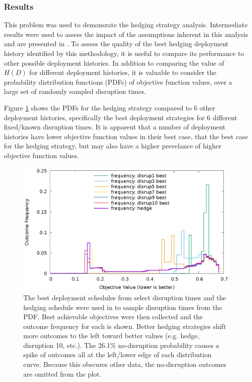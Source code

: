 \subsubsection{Results}

This problem was used to demonsrate the hedging strategy analysis.
Intermediate results were used to assess the impact of the assumptions
inherent in this analysis and are presented in .  To
assess the quality of the best hedging deployment history identified by this
methodology, it is useful to compare its performance to other possible
deployment histories.  In addition to comparing the value of $H(D)$ for
different deployment histories, it is valuable to consider the probability
distribution functions (PDFs) of objective function values, over a large set
of randomly sampled disruption times.


Figure \ref{fig:exp3-outcome-dists} shows the PDFs for the hedging strategy
compared to 6 other deployment histories, specifically the best deployment
strategies for 6 different fixed/known disruption times.  It is apparent that
a number of deployment histories have lower objective function values in their
best case, that the best case for the hedging strategy, but may also have a
higher prevelance of higher objective function values.

\begin{figure}[!htb]
    \centering
    \includegraphics[width=1.0\columnwidth]{dists.eps}
    \caption[Experiment 3: Outcome Distributions]{
        The best deployment schedules from select disruption times and the
        hedging schedule were used in to sample disruption times from the PDF.
        Best achievable objectives were then collected and the outcome
        frequency for each is shown.  Better hedging strategies shift more
        outcomes to the left toward better values (e.g. hedge, disruption 10,
        etc.).  The 26.1\% no-disruption probability causes a spike of
        outcomes all at the left/lower edge of each distribution curve.
        Because this obscures other data, the no-disruption outcomes are
        omitted from the plot.
    }
    \label{fig:exp3-outcome-dists}
\end{figure}


